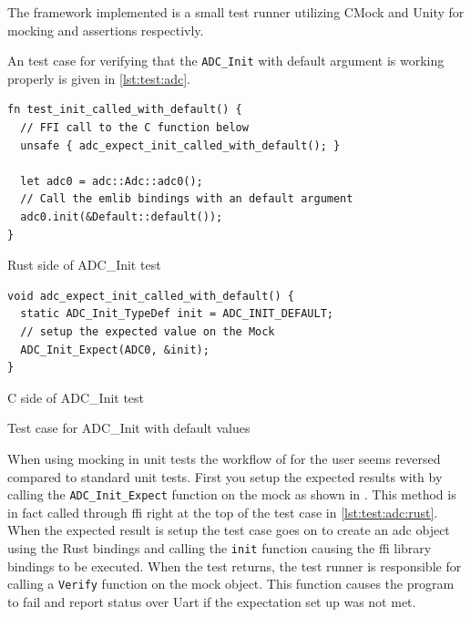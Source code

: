 The framework implemented is a small test runner utilizing CMock \cite{web:cmock} and Unity \cite{web:unity} for mocking and assertions respectivly.

An test case for verifying that the \texttt{ADC\_Init} with default argument is working properly is given in \autoref{lst:test:adc}.


\begin{listing}[H]
  \centering
  \begin{minipage}{\textwidth}
  \begin{listing}
    \begin{verbatim}
fn test_init_called_with_default() {
  // FFI call to the C function below
  unsafe { adc_expect_init_called_with_default(); }

  let adc0 = adc::Adc::adc0();
  // Call the emlib bindings with an default argument
  adc0.init(&Default::default());
}
    \end{verbatim}
    \label{lst:test:adc:rust}
    \caption{Rust side of ADC\_Init test}
  \end{listing}
  \end{minipage}

  \begin{minipage}{\textwidth}
  \begin{listing}
    \begin{verbatim}
void adc_expect_init_called_with_default() {
  static ADC_Init_TypeDef init = ADC_INIT_DEFAULT;
  // setup the expected value on the Mock
  ADC_Init_Expect(ADC0, &init);
}
    \end{verbatim}
    \label{lst:test:adc:c}
    \caption{C side of ADC\_Init test}
  \end{listing}
  \end{minipage}

  \caption{Test case for ADC\_Init with default values}
  \label{lst:test:adc}
\end{listing}

When using mocking in unit tests the workflow of for the user seems reversed compared to standard unit tests.
First you setup the expected results with by calling the \texttt{ADC\_Init\_Expect} function on the mock as shown in .
This method is in fact called through \gls{ffi} right at the top of the test case in \autoref{lst:test:adc:rust}.
When the expected result is setup the test case goes on to create an \gls{adc} object using the Rust bindings and calling the \texttt{init} function causing the \gls{ffi} library bindings to be executed.
When the test returns, the test runner is responsible for calling a \texttt{Verify} function on the mock object.
This function causes the program to fail and report status over Uart if the expectation set up was not met.

